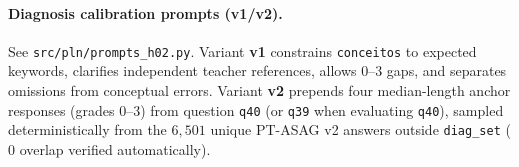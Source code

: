 \paragraph{Diagnosis calibration prompts (\textbf{v1}/\textbf{v2}).} See \texttt{src/pln/prompts\_h02.py}. Variant \textbf{v1} constrains \texttt{conceitos} to expected keywords, clarifies independent teacher references, allows $0$--$3$ gaps, and separates omissions from conceptual errors. Variant \textbf{v2} prepends four median-length anchor responses (grades $0$--$3$) from question \texttt{q40} (or \texttt{q39} when evaluating \texttt{q40}), sampled deterministically from the $6{,}501$ unique PT-ASAG v2 answers outside \texttt{diag\_set} ($0$ overlap verified automatically).
